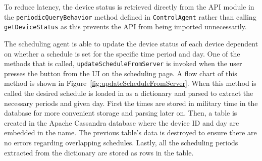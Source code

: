 \documentclass[conference]{IEEEtran}
\begin{document}
To reduce latency, the device status is retrieved directly from the API module in the \texttt{periodicQueryBehavior} method defined in \texttt{ControlAgent} rather than calling \texttt{getDeviceStatus} as this prevents the API from being imported unnecessarily.

The scheduling agent is able to update the device status of each device dependent on whether a schedule is set for the specific time period and day. One of the methods that is called, \texttt{updateScheduleFromServer} is invoked when the user presses the  button from the UI on the scheduling page. A flow chart of this method is shown in Figure~\ref{fig:updateScheduleFromServer}. When this method is called the desired schedule is loaded in as a dictionary and parsed to extract the necessary periods and given day. First the times are stored in military time in the database for more convenient storage and parsing later on. Then, a table is created in the Apache Cassandra database where the device ID and day are embedded in the name. The previous table's data is destroyed to ensure there are no errors regarding overlapping schedules. Lastly, all the scheduling periods extracted from the dictionary are stored as rows in the table. %
%
\end{document}
